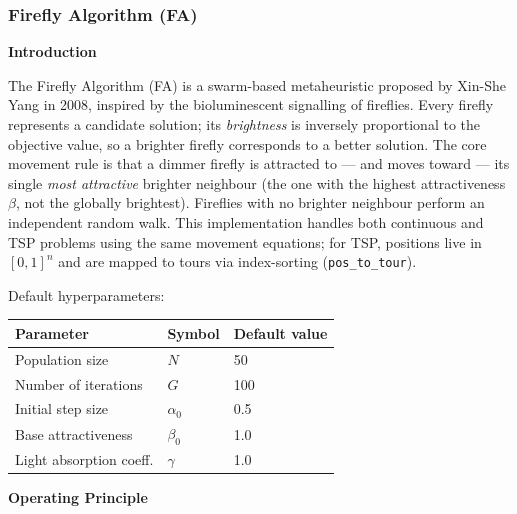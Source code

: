 \subsubsection{Firefly Algorithm (FA)}

\textbf{Introduction}

The Firefly Algorithm (FA) is a swarm-based metaheuristic proposed by Xin-She Yang in 2008,
inspired by the bioluminescent signalling of fireflies. Every firefly represents a candidate
solution; its \textit{brightness} is inversely proportional to the objective value, so a
brighter firefly corresponds to a better solution. The core movement rule is that a dimmer
firefly is attracted to --- and moves toward --- its single \textit{most attractive} brighter
neighbour (the one with the highest attractiveness $\beta$, not the globally brightest).
Fireflies with no brighter neighbour perform an independent random walk. This implementation
handles both continuous and TSP problems using the same movement equations; for TSP, positions
live in $[0,1]^n$ and are mapped to tours via index-sorting (\texttt{pos\_to\_tour}).

Default hyperparameters:
\begin{center}
\begin{tabular}{lll}
\hline
\textbf{Parameter} & \textbf{Symbol} & \textbf{Default value} \\
\hline
Population size        & $N$          & 50   \\
Number of iterations   & $G$          & 100  \\
Initial step size      & $\alpha_0$   & 0.5  \\
Base attractiveness    & $\beta_0$    & 1.0  \\
Light absorption coeff.& $\gamma$     & 1.0  \\
\hline
\end{tabular}
\end{center}

\textbf{Operating Principle}

